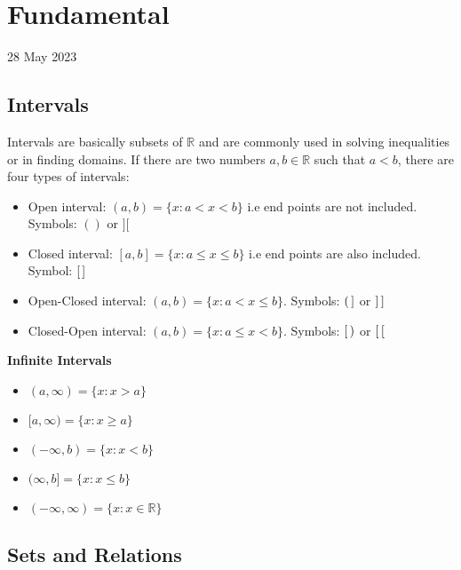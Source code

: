 \documentclass[12pt]{article}
\begin{document}
\tableofcontents
\newpage
\section{Fundamental}
28 May 2023
\subsection{Intervals}
Intervals are basically subsets of $\mathbb{R}$ and are commonly used in solving inequalities or in finding domains. If there are two numbers $a, b \in \mathbb{R}$ such that $a < b$, there are four types of intervals: 
\begin{itemize}
\item Open interval: $(a,b)=\{x:a<x<b\}$ i.e end points are not included. Symbols: $()$ or $][$
\item Closed interval: $[a,b]=\{x:a \le x \le b\}$ i.e end points are also included. Symbol: $[ \thinspace]$
\item Open-Closed interval: $(a,b)=\{x:a<x \le b\}$. Symbols: $( \thinspace ]$ or $]\thinspace]$
\item Closed-Open interval: $(a,b)=\{x:a \le x <b\}$. Symbols: $[ \thinspace )$ or $[\thinspace[$
\end{itemize}
\textbf{Infinite Intervals}
\begin{itemize}
\item $(a,\infty)= \{x:x>a\}$
\item $[a,\infty)=\{x:x \ge a\}$
\item $(-\infty,b)=\{x:x<b\}$
\item $(\infty,b]=\{x:x \le b\}$
\item $(-\infty,\infty)=\{x:x \in \mathbb{R}\}$
\end{itemize}
\subsection{Sets and Relations}
\end{document}
